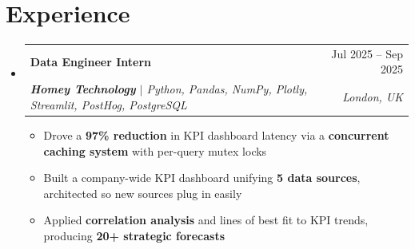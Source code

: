 \documentclass[letterpaper,10pt]{article}
\makeatletter
\newcommand{\resumeItem}[1]{
  \item\small{
    {#1 \vspace{-2pt}}
  }
}
\newcommand{\resumeSubheading}[4]{
  \vspace{-2pt}\item
    \begin{tabular*}{0.97\textwidth}[t]{l@{\extracolsep{\fill}}r}
      \textbf{#1} & #2 \\
      \textit{\small#3} & \textit{\small #4} \\
    \end{tabular*}\vspace{-7pt}
}
\newcommand{\resumeSubHeadingListStart}{\begin{itemize}[leftmargin=0.15in, label={}]}
\newcommand{\resumeSubHeadingListEnd}{\end{itemize}}
\newcommand{\resumeItemListStart}{\begin{itemize}}
\newcommand{\resumeItemListEnd}{\end{itemize}\vspace{-5pt}}
\makeatother
\begin{document}
\section{Experience}
  \resumeSubHeadingListStart
  \resumeSubheading
      {Data Engineer Intern}{Jul 2025 -- Sep 2025}
      {\textbf{Homey Technology} $|$ Python, Pandas, NumPy, Plotly, Streamlit, PostHog, PostgreSQL}{London, UK}
        \resumeItemListStart
          \resumeItem{Drove a \textbf{97\% reduction} in KPI dashboard latency via a \textbf{concurrent caching system} with per-query mutex locks}
          \resumeItem{Built a company-wide KPI dashboard unifying \textbf{5 data sources}, architected so new sources plug in easily}
          \resumeItem{Applied \textbf{correlation analysis} and lines of best fit to KPI trends, producing \textbf{20+ strategic forecasts}}
        \resumeItemListEnd


  \resumeSubHeadingListEnd

\end{document}
